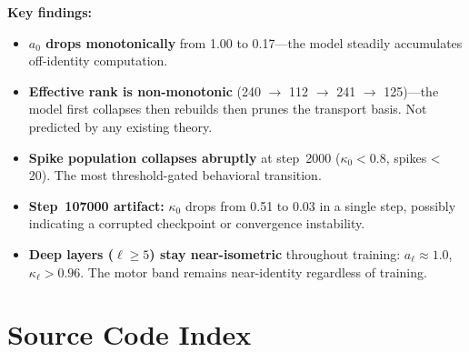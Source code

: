 \documentclass[11pt,a4paper]{article}
\begin{document}
\noindent\textbf{Key findings:}
\begin{itemize}
  \item \textbf{$a_0$ drops monotonically} from 1.00 to 0.17---the model steadily accumulates off-identity computation.
  \item \textbf{Effective rank is non-monotonic} (240 $\to$ 112 $\to$ 241 $\to$ 125)---the model first collapses then rebuilds then prunes the transport basis. Not predicted by any existing theory.
  \item \textbf{Spike population collapses abruptly} at step~2000 ($\kappa_0 < 0.8$, spikes < 20). The most threshold-gated behavioral transition.
  \item \textbf{Step~107000 artifact:} $\kappa_0$ drops from 0.51 to 0.03 in a single step, possibly indicating a corrupted checkpoint or convergence instability.
  \item \textbf{Deep layers ($\ell \geq 5$) stay near-isometric} throughout training: $a_\ell \approx 1.0$, $\kappa_\ell > 0.96$. The motor band remains near-identity regardless of training.
\end{itemize}

\section{Source Code Index}
\end{document}
